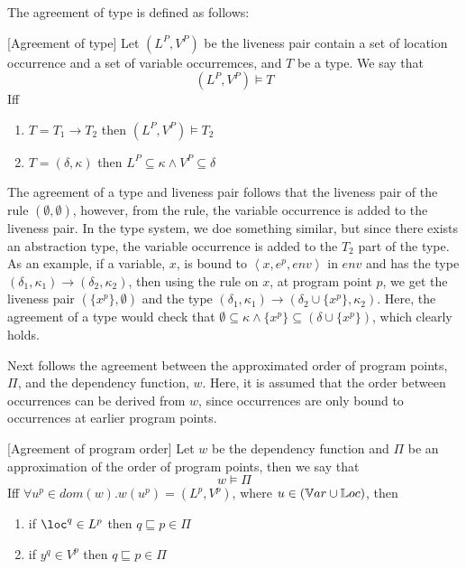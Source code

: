 \documentclass[../../master.tex]{subfiles}
\begin{document}
The agreement of type is defined as follows:

\begin{definition}{[Agreement of type]}
	Let $(L^P,V^P)$ be the liveness pair contain a set of location occurrence and a set of variable occurremces, and $T$ be a type.
	We say that
	$$(L^P,V^P)\models T$$
	Iff
	\begin{enumerate}
		\item $T=T_1\rightarrow T_2$ then $(L^P,V^P)\models T_2$
		\item $T=(\delta,\kappa)$ then $L^P\subseteq\kappa\wedge V^P\subseteq\delta$
	\end{enumerate}
\end{definition}
The agreement of a type and liveness pair follows that the liveness pair of the  rule $(\emptyset,\emptyset)$, however, from the  rule, the variable occurrence is added to the liveness pair.
In the type system, we doe something similar, but since there exists an abstraction type, the variable occurrence is added to the $T_2$ part of the type.
As an example, if a variable, $x$, is bound to $\left\langle x,e^p,env\right\rangle$ in $env$ and has the type $(\delta_1,\kappa_1)\rightarrow(\delta_2,\kappa_2)$, then using the  rule on $x$, at program point $p$, we get the liveness pair $(\{x^p\},\emptyset)$ and the type $(\delta_1,\kappa_1)\rightarrow(\delta_2\cup\{x^p\},\kappa_2)$.
Here, the agreement of a type would check that $\emptyset\subseteq\kappa\wedge\{x^p\}\subseteq(\delta\cup\{x^p\})$, which clearly holds.

Next follows the agreement between the approximated order of program points, $\Pi$, and the dependency function, $w$.
Here, it is assumed that the order between occurrences can be derived from $w$, since occurrences are only bound to occurrences at earlier program points.

\begin{definition}{[Agreement of program order]}
	Let $w$ be the dependency function and $\Pi$ be an approximation of the order of program points, then we say that
	$$w\models\Pi$$
	Iff $\forall u^p\in dom(w).w(u^p)=(L^p,V^p)$, where $u\in(\mathbb{V}ar\cup\mathbb{L}oc)$, then
	\begin{enumerate}
		\item if $\loc^q\in L^p$ then $q\sqsubseteq p\in\Pi$
		\item if $y^q\in V^p$ then $q\sqsubseteq p\in\Pi$
	\end{enumerate}
\end{definition}
\end{document}
